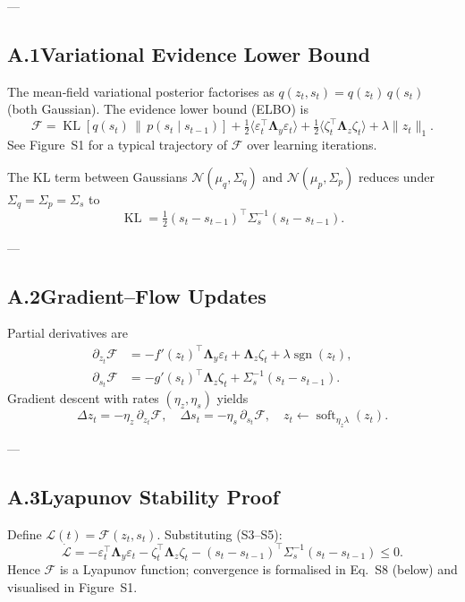 \documentclass[12pt]{article}
\begin{document}
---
\subsection*{A.1\quad Variational Evidence Lower Bound}
The mean‑field variational posterior factorises as $q(z_t,s_t)=q(z_t)\,q(s_t)$ (both Gaussian).  The evidence lower bound (ELBO) is
\begin{equation}
\mathcal F=\operatorname{KL}[q(s_t)\,\|\,p(s_t\mid s_{t-1})]+\tfrac12\langle\varepsilon_t^{\!\top}\boldsymbol\Lambda_y\varepsilon_t\rangle+\tfrac12\langle\zeta_t^{\!\top}\boldsymbol\Lambda_z\zeta_t\rangle+\lambda\|z_t\|_1.
\tag{S1}
\end{equation}
See Figure~S1 for a typical trajectory of $\mathcal F$ over learning iterations.

The KL term between Gaussians $\mathcal N(\mu_q,\Sigma_q)$ and $\mathcal N(\mu_p,\Sigma_p)$ reduces under $\Sigma_q\!=\!\Sigma_p\!=\!\Sigma_s$ to
\begin{equation}
\operatorname{KL}=\tfrac12(s_t-s_{t-1})^\top\Sigma_s^{-1}(s_t-s_{t-1}).
\tag{S2}
\end{equation}

---
\subsection*{A.2\quad Gradient–Flow Updates}
Partial derivatives are
\begin{align}
\partial_{z_t}\mathcal F &= -f'(z_t)^\top\boldsymbol\Lambda_y\varepsilon_t+\boldsymbol\Lambda_z\zeta_t+\lambda\operatorname{sgn}(z_t), &&\tag{S3}\\[4pt]
\partial_{s_t}\mathcal F &= -g'(s_t)^\top\boldsymbol\Lambda_z\zeta_t+\Sigma_s^{-1}(s_t-s_{t-1}). &&\tag{S4}
\end{align}
Gradient descent with rates $(\eta_z,\eta_s)$ yields
\begin{equation}
\Delta z_t=-\eta_z\,\partial_{z_t}\mathcal F,\quad \Delta s_t=-\eta_s\,\partial_{s_t}\mathcal F,\quad z_t\leftarrow\operatorname{soft}_{\eta_z\lambda}(z_t).
\tag{S5}
\end{equation}

---
\subsection*{A.3\quad Lyapunov Stability Proof}
Define $\mathcal L(t)=\mathcal F(z_t,s_t)$. Substituting (S3–S5):
\begin{equation}
\dot{\mathcal L}= -\varepsilon_t^{\!\top}\boldsymbol\Lambda_y\varepsilon_t - \zeta_t^{\!\top}\boldsymbol\Lambda_z\zeta_t - (s_t-s_{t-1})^\top\Sigma_s^{-1}(s_t-s_{t-1})\le0.\tag{S6}
\end{equation}
Hence $\mathcal F$ is a Lyapunov function; convergence is formalised in Eq.~S8 (below) and visualised in Figure~S1.
\end{document}
